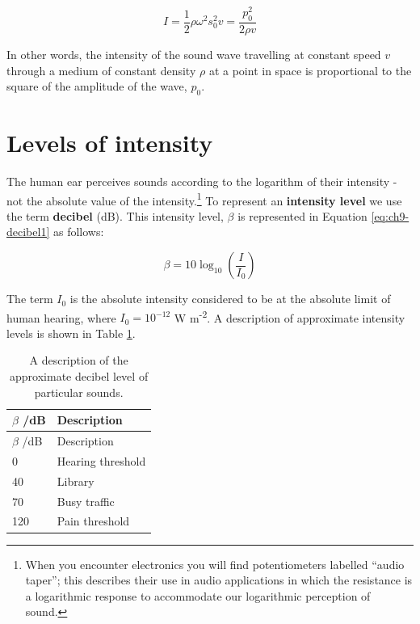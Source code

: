 \documentclass[
]{book}
\begin{document}
\begin{equation}
I = \frac{1}{2}\rho \omega^2 s_0^2 v = \frac{p_0^2}{2\rho v}
\label{eq:ch9-waveintensity3}
\end{equation}

In other words, the intensity of the sound wave travelling at constant speed \(v\) through a medium of constant density \(\rho\) at a point in space is proportional to the square of the amplitude of the wave, \(p_0\).

\hypertarget{sec-ch9-intensitylevels}{%
\section{Levels of intensity}\label{sec-ch9-intensitylevels}}

The human ear perceives sounds according to the logarithm of their intensity - not the absolute value of the intensity.\footnote{When you encounter electronics you will find potentiometers labelled ``audio taper''; this describes their use in audio applications in which the resistance is a logarithmic response to accommodate our logarithmic perception of sound.} To represent an \textbf{intensity level} we use the term \textbf{decibel} (dB). This intensity level, \(\beta\) is represented in Equation \eqref{eq:ch9-decibel1} as follows:

\begin{equation}
\beta = 10 \log_{10}\left(\frac{I}{I_0}\right)
\label{eq:ch9-decibel1}
\end{equation}

The term \(I_0\) is the absolute intensity considered to be at the absolute limit of human hearing, where \(I_0 = 10^{-12}\) W m\textsuperscript{-2}. A description of approximate intensity levels is shown in Table \ref{tab:ch9-decibeldescription1}.

\begin{longtable}[]{@{}ll@{}}
\caption{\label{tab:ch9-decibeldescription1} A description of the approximate decibel level of particular sounds.}\tabularnewline
\toprule()
\(\beta\) /dB & Description \\
\midrule()
\endfirsthead
\toprule()
\(\beta\) /dB & Description \\
\midrule()
\endhead
0 & Hearing threshold \\
40 & Library \\
70 & Busy traffic \\
120 & Pain threshold \\
\bottomrule()
\end{longtable}
\end{document}
